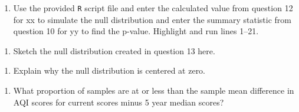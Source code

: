 \documentclass[
]{report}
\newenvironment{Shaded}{\begin{snugshade}}{\end{snugshade}}
\newcommand{\CommentTok}[1]{\textcolor[rgb]{0.56,0.35,0.01}{\textit{#1}}}
\newcommand{\DataTypeTok}[1]{\textcolor[rgb]{0.13,0.29,0.53}{#1}}
\newcommand{\DecValTok}[1]{\textcolor[rgb]{0.00,0.00,0.81}{#1}}
\newcommand{\KeywordTok}[1]{\textcolor[rgb]{0.13,0.29,0.53}{\textbf{#1}}}
\newcommand{\NormalTok}[1]{#1}
\newcommand{\OperatorTok}[1]{\textcolor[rgb]{0.81,0.36,0.00}{\textbf{#1}}}
\newcommand{\StringTok}[1]{\textcolor[rgb]{0.31,0.60,0.02}{#1}}
\providecommand{\tightlist}{%
  \setlength{\itemsep}{0pt}\setlength{\parskip}{0pt}}
\begin{document}
\vspace{.7in}

\begin{enumerate}
\def\labelenumi{\arabic{enumi}.}
\setcounter{enumi}{12}
\tightlist
\item
  Use the provided \texttt{R} script file and enter the calculated value from question 12 for xx to simulate the null distribution and enter the summary statistic from question 10 for yy to find the p-value. Highlight and run lines 1--21.
\end{enumerate}

\begin{Shaded}
\end{Shaded}

\begin{enumerate}
\def\labelenumi{\arabic{enumi}.}
\setcounter{enumi}{13}
\tightlist
\item
  Sketch the null distribution created in question 13 here.
\end{enumerate}

\vspace{2in}

\begin{enumerate}
\def\labelenumi{\arabic{enumi}.}
\setcounter{enumi}{14}
\tightlist
\item
  Explain why the null distribution is centered at zero.
\end{enumerate}

\vspace{.5in}

\begin{enumerate}
\def\labelenumi{\arabic{enumi}.}
\setcounter{enumi}{15}
\tightlist
\item
  What proportion of samples are at or less than the sample mean difference in AQI scores for current scores minus 5 year median scores?
\end{enumerate}
\end{document}
